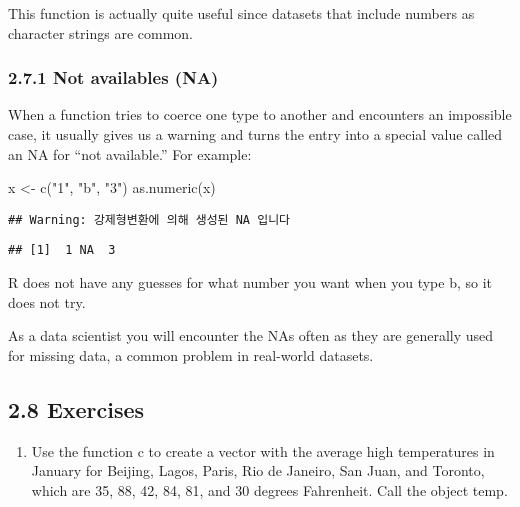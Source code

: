 \documentclass[
]{article}
\newenvironment{Shaded}{\begin{snugshade}}{\end{snugshade}}
\newcommand{\FunctionTok}[1]{\textcolor[rgb]{0.00,0.00,0.00}{#1}}
\newcommand{\NormalTok}[1]{#1}
\newcommand{\OtherTok}[1]{\textcolor[rgb]{0.56,0.35,0.01}{#1}}
\newcommand{\StringTok}[1]{\textcolor[rgb]{0.31,0.60,0.02}{#1}}
\providecommand{\tightlist}{%
  \setlength{\itemsep}{0pt}\setlength{\parskip}{0pt}}
\begin{document}
This function is actually quite useful since datasets that include
numbers as character strings are common.

\hypertarget{not-availables-na}{%
\subsubsection{2.7.1 Not availables (NA)}\label{not-availables-na}}

When a function tries to coerce one type to another and encounters an
impossible case, it usually gives us a warning and turns the entry into
a special value called an NA for ``not available.'' For example:

\begin{Shaded}
\begin{Highlighting}[]
\NormalTok{x }\OtherTok{\textless{}{-}} \FunctionTok{c}\NormalTok{(}\StringTok{"1"}\NormalTok{, }\StringTok{"b"}\NormalTok{, }\StringTok{"3"}\NormalTok{)}
\FunctionTok{as.numeric}\NormalTok{(x)}
\end{Highlighting}
\end{Shaded}

\begin{verbatim}
## Warning: 강제형변환에 의해 생성된 NA 입니다
\end{verbatim}

\begin{verbatim}
## [1]  1 NA  3
\end{verbatim}

R does not have any guesses for what number you want when you type b, so
it does not try.

As a data scientist you will encounter the NAs often as they are
generally used for missing data, a common problem in real-world
datasets.

\hypertarget{exercises-2}{%
\subsection{2.8 Exercises}\label{exercises-2}}

\begin{enumerate}
\def\labelenumi{\arabic{enumi}.}
\tightlist
\item
  Use the function c to create a vector with the average high
  temperatures in January for Beijing, Lagos, Paris, Rio de Janeiro, San
  Juan, and Toronto, which are 35, 88, 42, 84, 81, and 30 degrees
  Fahrenheit. Call the object temp.
\end{enumerate}
\end{document}
